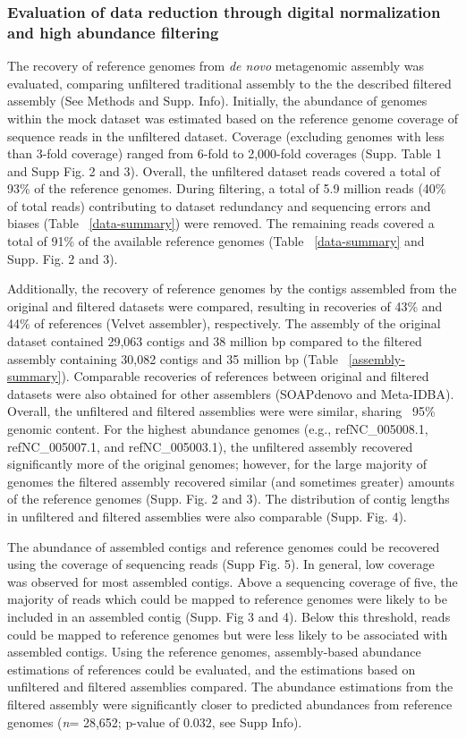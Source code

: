 \documentclass[11pt]{article} %
\begin{document}
\subsubsection{Evaluation of data reduction through digital normalization 
and high abundance filtering}

The recovery of reference genomes from {\em de novo} metagenomic assembly
was evaluated, comparing unfiltered traditional assembly to the the
described filtered assembly (See Methods and Supp. Info). Initially,
the abundance of genomes within the mock dataset was estimated based
on the reference genome coverage of sequence reads in the unfiltered
dataset.  Coverage (excluding genomes with less than 3-fold coverage)
ranged from 6-fold to 2,000-fold coverages (Supp. Table
1 and Supp Fig. 2 and 3).  Overall, the unfiltered dataset reads covered a
total of 93\% of the reference genomes.  During filtering, a total of
5.9 million reads (40\% of total reads) contributing to dataset
redundancy and sequencing errors and biases (Table ~\ref{data-summary}) 
were removed.  The remaining reads covered a total of 91\% of the available 
reference genomes (Table ~\ref{data-summary} and Supp. Fig. 2 and 3).

Additionally, the recovery of reference genomes by the contigs
assembled from the original and filtered datasets were compared,
resulting in recoveries of 43\% and 44\% of references (Velvet
assembler), respectively.  The assembly of the original dataset
contained 29,063 contigs and 38 million bp compared to the filtered
assembly containing 30,082 contigs and 35 million bp (Table
~\ref{assembly-summary}).  Comparable recoveries of references between
original and filtered datasets were also obtained for other assemblers
(SOAPdenovo and Meta-IDBA).  Overall, the unfiltered and filtered
assemblies were were similar, sharing ~95\% genomic content.  For the
highest abundance genomes (e.g., ref\textbar{}NC\_005008.1,
ref\textbar{}NC\_005007.1, and ref\textbar{}NC\_005003.1), the
unfiltered assembly recovered significantly more of the original
genomes; however, for the large majority of genomes the filtered
assembly recovered similar (and sometimes greater) amounts of the
reference genomes (Supp. Fig. 2 and 3).  The distribution of contig
lengths in unfiltered and filtered assemblies were also comparable
(Supp. Fig. 4).

The abundance of assembled contigs and reference genomes could be
recovered using the coverage of sequencing reads (Supp Fig. 5).  In
general, low coverage was observed for most assembled contigs. Above 
a sequencing coverage of five, the majority of reads
which could be mapped to reference genomes were likely to be included
in an assembled contig (Supp. Fig 3 and 4).  Below this threshold,
reads could be mapped to reference genomes but were less likely to be
associated with assembled contigs.  Using the reference genomes,
assembly-based abundance estimations of references could be evaluated,
and the estimations based on unfiltered and filtered assemblies
compared.  The abundance estimations from the filtered assembly were
significantly closer to predicted abundances from reference genomes
(\emph{n}= 28,652; p-value of 0.032, see Supp Info).
\end{document}
